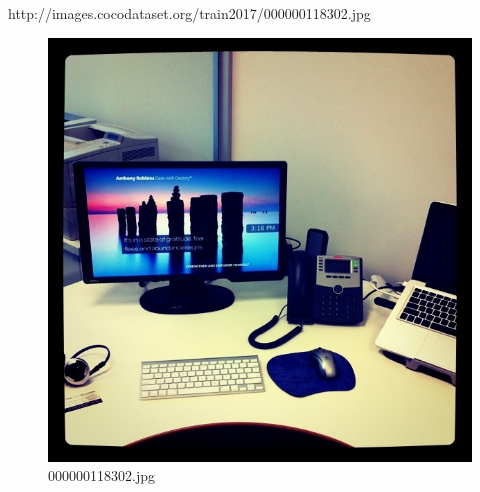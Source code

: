 http://images.cocodataset.org/train2017/000000118302.jpg
\begin{figure}[h]
    \centering
    \includegraphics[width=0.8\linewidth]{../image set/hard/000000118302.jpg}
    \caption{000000118302.jpg}
\end{figure}
